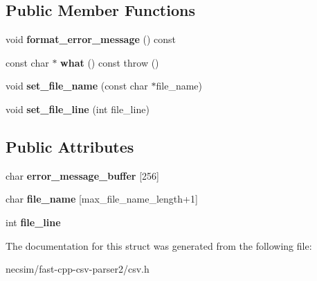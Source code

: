 \subsection*{Public Member Functions}
\begin{DoxyCompactItemize}
\item 
void {\bfseries format\+\_\+error\+\_\+message} () const \hypertarget{structio_1_1error_1_1too__many__columns_ad5cc8b4251752fec054163a9d6d0876a}{}\label{structio_1_1error_1_1too__many__columns_ad5cc8b4251752fec054163a9d6d0876a}

\item 
const char $\ast$ {\bfseries what} () const   throw ()\hypertarget{structio_1_1error_1_1base_ad99d4a2459e51ce2c24707569c4a0df6}{}\label{structio_1_1error_1_1base_ad99d4a2459e51ce2c24707569c4a0df6}

\item 
void {\bfseries set\+\_\+file\+\_\+name} (const char $\ast$file\+\_\+name)\hypertarget{structio_1_1error_1_1with__file__name_ae765de62778c989d4658b4efe2995390}{}\label{structio_1_1error_1_1with__file__name_ae765de62778c989d4658b4efe2995390}

\item 
void {\bfseries set\+\_\+file\+\_\+line} (int file\+\_\+line)\hypertarget{structio_1_1error_1_1with__file__line_aa92778a81778abc676ec6ee9952bba8c}{}\label{structio_1_1error_1_1with__file__line_aa92778a81778abc676ec6ee9952bba8c}

\end{DoxyCompactItemize}
\subsection*{Public Attributes}
\begin{DoxyCompactItemize}
\item 
char {\bfseries error\+\_\+message\+\_\+buffer} \mbox{[}256\mbox{]}\hypertarget{structio_1_1error_1_1base_a8e38f86a7afea1f0c6e6cac0c548d6f2}{}\label{structio_1_1error_1_1base_a8e38f86a7afea1f0c6e6cac0c548d6f2}

\item 
char {\bfseries file\+\_\+name} \mbox{[}max\+\_\+file\+\_\+name\+\_\+length+1\mbox{]}\hypertarget{structio_1_1error_1_1with__file__name_ac957d5590a8b95517b74eb5bf373a424}{}\label{structio_1_1error_1_1with__file__name_ac957d5590a8b95517b74eb5bf373a424}

\item 
int {\bfseries file\+\_\+line}\hypertarget{structio_1_1error_1_1with__file__line_a391298c37172bcdb83aeb3daf65d5a0e}{}\label{structio_1_1error_1_1with__file__line_a391298c37172bcdb83aeb3daf65d5a0e}

\end{DoxyCompactItemize}


The documentation for this struct was generated from the following file\+:\begin{DoxyCompactItemize}
\item 
necsim/fast-\/cpp-\/csv-\/parser2/csv.\+h\end{DoxyCompactItemize}
